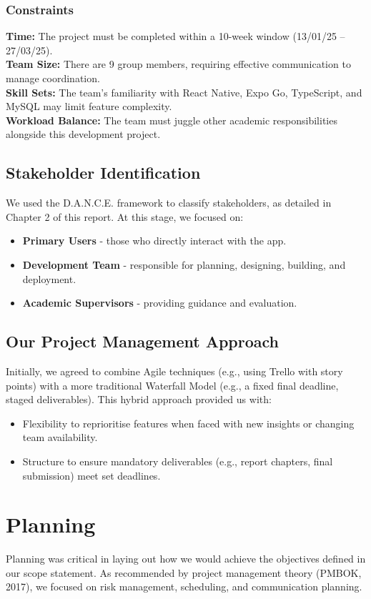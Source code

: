 \subsubsection{Constraints}
\textbf{Time:} The project must be completed within a 10-week window (13/01/25 – 27/03/25).\\
\textbf{Team Size:} There are 9 group members, requiring effective communication to manage coordination.\\
\textbf{Skill Sets:} The team’s familiarity with React Native, Expo Go, TypeScript, and MySQL may limit feature complexity.\\
\textbf{Workload Balance:} The team must juggle other academic responsibilities alongside this development project.

\subsection{Stakeholder Identification}
We used the D.A.N.C.E. framework to classify stakeholders, as detailed in Chapter 2 of this report. At this stage, we focused on:
\begin{itemize}
    \item \textbf{Primary Users} - those who directly interact with the app.
    \item \textbf{Development Team} - responsible for planning, designing, building, and deployment.
    \item \textbf{Academic Supervisors} - providing guidance and evaluation.
\end{itemize}

\subsection{Our Project Management Approach}
Initially, we agreed to combine Agile techniques (e.g., using Trello with story points) with a more traditional Waterfall Model (e.g., a fixed final deadline, staged deliverables). This hybrid approach provided us with:
\begin{itemize}
    \item Flexibility to reprioritise features when faced with new insights or changing team availability.
    \item Structure to ensure mandatory deliverables (e.g., report chapters, final submission) meet set deadlines.
\end{itemize}

\section{Planning}
Planning was critical in laying out how we would achieve the objectives defined in our scope statement. As recommended by project management theory (PMBOK, 2017), we focused on risk management, scheduling, and communication planning.

